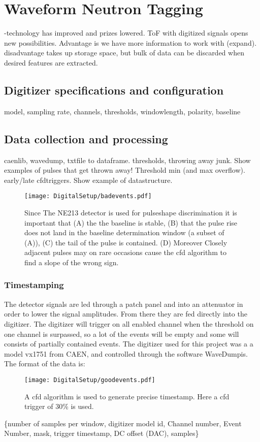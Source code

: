 \documentclass[main.tex]{subfiles}
\begin{document}
\section{Waveform Neutron Tagging}
-technology has improved and prizes lowered. ToF with digitized signals opens new possibilities. Advantage is we have more information to work with (expand). disadvantage takes up storage space, but bulk of data can be discarded when desired features are extracted.
\subsection{Digitizer specifications and configuration}
model, sampling rate, channels, thresholds, windowlength, polarity, baseline
\subsection{Data collection and processing}
caenlib, wavedump, txtfile to dataframe. thresholds, throwing away junk.
Show examples of pulses that get thrown away! Threshold min (and max overflow). early/late cfdtriggers.
Show example of datastructure.

\begin{figure}[ht!]
    \centering
        \texttt{[image: DigitalSetup/badevents.pdf]}
        \caption{Since The NE213 detector is used for pulseshape discrimination it is important that (A) the the baseline is stable, (B) that the pulse rise does not land in the baseline determination window (a subset of (A)), (C) the tail of the pulse is contained. (D) Moreover Closely adjacent pulses may on rare occasions cause the cfd algorithm to find a slope of the wrong sign.}
    \label{fig:badevents} 
\end{figure}

\subsubsection{Timestamping}
The detector signals are led through a patch panel and into an attenuator in order to lower the signal amplitudes. From there they are fed directly into the digitizer. The digitizer will trigger on all enabled channel when the threshold on one channel is surpassed, so a lot of the events will be empty and some will consists of partially contained events. The digitizer used for this project was a a model vx1751 from CAEN, and controlled through the software WaveDumpis. The format of the data is:
\begin{figure}[ht!]
    \centering
        \texttt{[image: DigitalSetup/goodevents.pdf]}
        \caption{A cfd algorithm is used to generate precise timestamp. Here a cfd trigger of 30\% is used.}
    \label{fig:badevents} 
\end{figure}
\{number of samples per window, digitizer model id, Channel number, Event Number, mask, trigger timestamp, DC offset (DAC), samples\}
\end{document}
